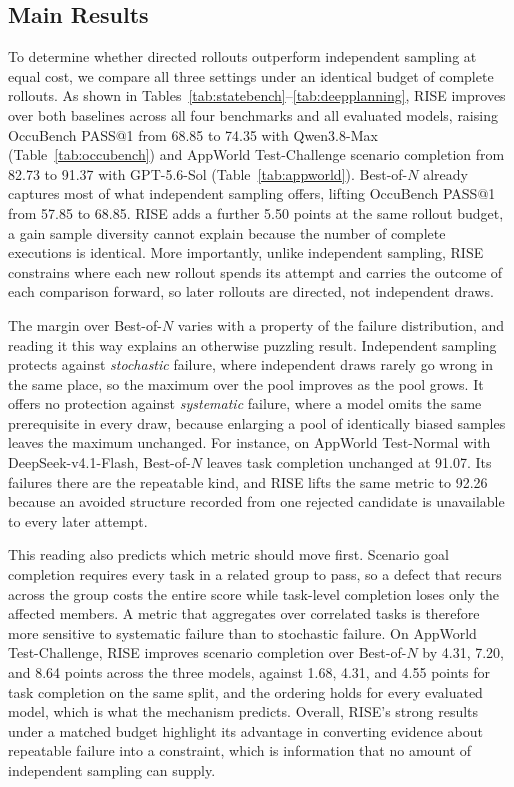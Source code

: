 \documentclass{article}
\newcommand{\method}{RISE\xspace}
\begin{document}
\subsection{Main Results}
To determine whether directed rollouts outperform independent sampling at equal cost, we compare all three settings under an identical budget of complete rollouts. As shown in Tables~\ref{tab:statebench}--\ref{tab:deepplanning}, \method improves over both baselines across all four benchmarks and all evaluated models, raising OccuBench PASS@1 from 68.85 to 74.35 with Qwen3.8-Max (Table~\ref{tab:occubench}) and AppWorld Test-Challenge scenario completion from 82.73 to 91.37 with GPT-5.6-Sol (Table~\ref{tab:appworld}). \mbox{Best-of-$N$} already captures most of what independent sampling offers, lifting OccuBench PASS@1 from 57.85 to 68.85. \method adds a further 5.50 points at the same rollout budget, a gain sample diversity cannot explain because the number of complete executions is identical. More importantly, unlike independent sampling, \method constrains where each new rollout spends its attempt and carries the outcome of each comparison forward, so later rollouts are directed, not independent draws.

The margin over \mbox{Best-of-$N$} varies with a property of the failure distribution, and reading it this way explains an otherwise puzzling result. Independent sampling protects against \emph{stochastic} failure, where independent draws rarely go wrong in the same place, so the maximum over the pool improves as the pool grows. It offers no protection against \emph{systematic} failure, where a model omits the same prerequisite in every draw, because enlarging a pool of identically biased samples leaves the maximum unchanged. For instance, on AppWorld Test-Normal with DeepSeek-v4.1-Flash, \mbox{Best-of-$N$} leaves task completion unchanged at 91.07. Its failures there are the repeatable kind, and \method lifts the same metric to 92.26 because an avoided structure recorded from one rejected candidate is unavailable to every later attempt.

This reading also predicts which metric should move first. Scenario goal completion requires every task in a related group to pass, so a defect that recurs across the group costs the entire score while task-level completion loses only the affected members. A metric that aggregates over correlated tasks is therefore more sensitive to systematic failure than to stochastic failure. On AppWorld Test-Challenge, \method improves scenario completion over \mbox{Best-of-$N$} by 4.31, 7.20, and 8.64 points across the three models, against 1.68, 4.31, and 4.55 points for task completion on the same split, and the ordering holds for every evaluated model, which is what the mechanism predicts. Overall, \method's strong results under a matched budget highlight its advantage in converting evidence about repeatable failure into a constraint, which is information that no amount of independent sampling can supply.
\end{document}
